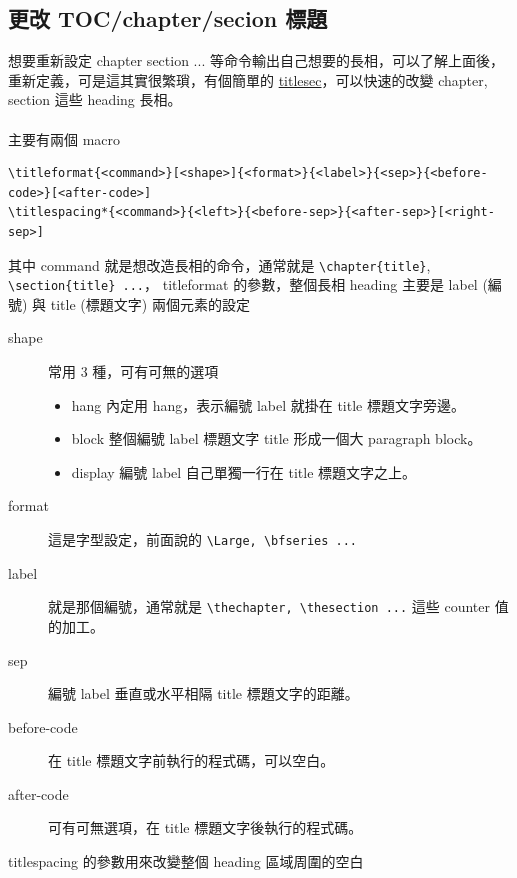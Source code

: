   \subsection{更改 TOC/chapter/secion 標題}
  想要重新設定 chapter section ... 等命令輸出自己想要的長相，可以了解上面後，
  重新定義，可是這其實很繁瑣，有個簡單的
  \href{https://ctan.org/pkg/titlesec?lang=en}{titlesec}，可以快速的改變
  chapter, section 這些 heading 長相。
  \\\\
  主要有兩個 macro
  \begin{verbatim}
\titleformat{<command>}[<shape>]{<format>}{<label>}{<sep>}{<before-code>}[<after-code>]
\titlespacing*{<command>}{<left>}{<before-sep>}{<after-sep>}[<right-sep>]
  \end{verbatim}
  其中 command 就是想改造長相的命令，通常就是 \verb=\chapter{title}=,
  \verb=\section{title} ...=， titleformat 的參數，整個長相 heading 主要是
  label (編號) 與 title (標題文字)
  兩個元素的設定
  \begin{description}
    \item [shape] 常用 3 種，可有可無的選項
      \begin{itemize}
        \item hang 內定用 hang，表示編號 label 就掛在 title 標題文字旁邊。
        \item block 整個編號 label 標題文字 title 形成一個大 paragraph block。
        \item display 編號 label 自己單獨一行在 title 標題文字之上。
      \end{itemize}
    \item [format] 這是字型設定，前面說的 \verb=\Large, \bfseries ...=
    \item [label] 就是那個編號，通常就是 \verb=\thechapter, \thesection ...=
      這些 counter 值的加工。
    \item [sep] 編號 label 垂直或水平相隔 title 標題文字的距離。
    \item [before-code] 在 title 標題文字前執行的程式碼，可以空白。
    \item [after-code] 可有可無選項，在 title 標題文字後執行的程式碼。
  \end{description}
  titlespacing 的參數用來改變整個 heading 區域周圍的空白
